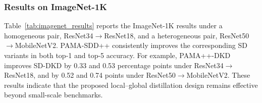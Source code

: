 \documentclass[a4paper,fleqn]{cas-dc}
\begin{document}
\subsubsection{Results on ImageNet-1K}
\label{subsec:imagenet_results}

Table~\ref{tab:imagenet_results} reports the ImageNet-1K results under a
homogeneous pair, ResNet34$\rightarrow$ResNet18, and a heterogeneous pair,
ResNet50$\rightarrow$MobileNetV2. PAMA-SDD++ consistently improves the
corresponding SD variants in both top-1 and top-5 accuracy. For example,
PAMA++-DKD improves SD-DKD by 0.33 and 0.53 percentage points under
ResNet34$\rightarrow$ResNet18, and by 0.52 and 0.74 points under
ResNet50$\rightarrow$MobileNetV2. These results indicate that the proposed
local--global distillation design remains effective beyond small-scale
benchmarks.
\end{document}
